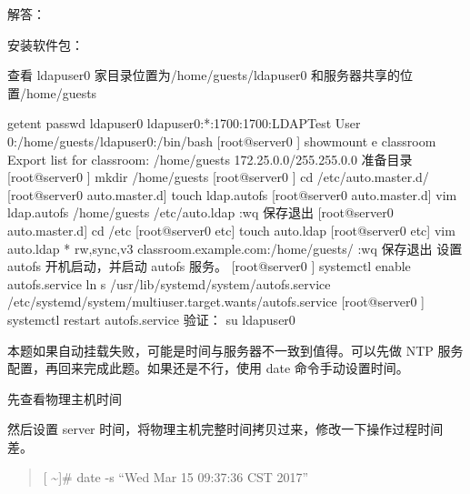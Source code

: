 \documentclass[letterpaper,10pt,english]{sphinxmanual}
\begin{document}
解答：

安装软件包：

%
\begin{sphinxVerbatim}[commandchars=\\\{\}]
\PYG{p}{[} \PYG{p}{]}
\end{sphinxVerbatim}

查看 ldapuser0 家目录位置为/home/guests/ldapuser0 和服务器共享的位置/home/guests

%
\begin{sphinxVerbatim}\PYGZsh{} getent passwd ldapuser0
ldapuser0:*:1700:1700:LDAPTest User 0:/home/guests/ldapuser0:/bin/bash
[root@server0 \PYGZti{}]\PYGZsh{} showmount \PYGZhy{}e classroom Export list for classroom:
/home/guests 172.25.0.0/255.255.0.0
准备目录
[root@server0 \PYGZti{}]\PYGZsh{} mkdir /home/guests
[root@server0 \PYGZti{}]\PYGZsh{} cd /etc/auto.master.d/
[root@server0 auto.master.d]\PYGZsh{} touch ldap.autofs
[root@server0 auto.master.d]\PYGZsh{} vim ldap.autofs
/home/guests        /etc/auto.ldap
:wq 保存退出
[root@server0 auto.master.d]\PYGZsh{} cd /etc
[root@server0 etc]\PYGZsh{} touch auto.ldap
[root@server0 etc]\PYGZsh{} vim auto.ldap
*   \PYGZhy{}rw,sync,v3     classroom.example.com:/home/guests/\PYGZam{}
:wq 保存退出
设置 autofs 开机启动，并启动 autofs 服务。
[root@server0 \PYGZti{}]\PYGZsh{} systemctl enable autofs.service
ln  \PYGZhy{}s      \PYGZsq{}/usr/lib/systemd/system/autofs.service\PYGZsq{} \PYGZsq{}/etc/systemd/system/multi\PYGZhy{}user.target.wants/autofs.service\PYGZsq{}
[root@server0 \PYGZti{}]\PYGZsh{} systemctl restart autofs.service
验证：
su \PYGZhy{} ldapuser0
\end{sphinxVerbatim}

本题如果自动挂载失败，可能是时间与服务器不一致到值得。可以先做 NTP 服务配置，再回来完成此题。如果还是不行，使用 date 命令手动设置时间。

先查看物理主机时间

%
\begin{sphinxVerbatim}[commandchars=\\\{\}]
\end{sphinxVerbatim}

然后设置 server 时间，将物理主机完整时间拷贝过来，修改一下操作过程时间差。
\begin{quote}

{[} \textasciitilde{}{]}\# date -s “Wed Mar 15 09:37:36 CST 2017”
\end{quote}
\end{document}
